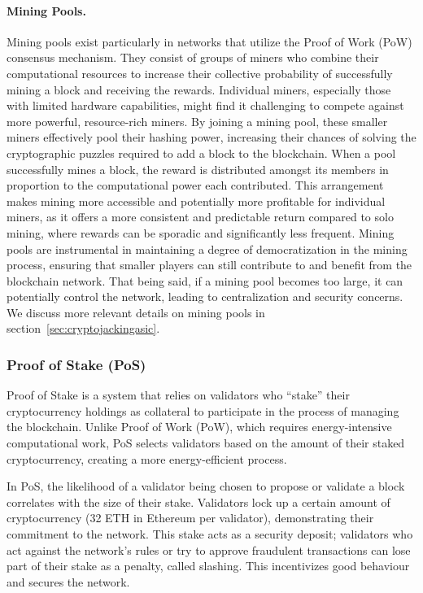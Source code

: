 \paragraph{Mining Pools.}
Mining pools exist particularly in networks that utilize the Proof of Work (PoW) consensus mechanism. They consist of groups of miners who combine their computational resources to increase their collective probability of successfully mining a block and receiving the rewards. Individual miners, especially those with limited hardware capabilities, might find it challenging to compete against more powerful, resource-rich miners. By joining a mining pool, these smaller miners effectively pool their hashing power, increasing their chances of solving the cryptographic puzzles required to add a block to the blockchain. When a pool successfully mines a block, the reward is distributed amongst its members in proportion to the computational power each contributed. This arrangement makes mining more accessible and potentially more profitable for individual miners, as it offers a more consistent and predictable return compared to solo mining, where rewards can be sporadic and significantly less frequent. Mining pools are instrumental in maintaining a degree of democratization in the mining process, ensuring that smaller players can still contribute to and benefit from the blockchain network. That being said, if a mining pool becomes too large, it can potentially control the network, leading to centralization and security concerns. We discuss more relevant details on mining pools in section~\ref{sec:cryptojackingasic}.



\subsubsection{Proof of Stake (PoS)}
Proof of Stake is a system that relies on validators who ``stake'' their cryptocurrency holdings as collateral to participate in the process of managing the blockchain. Unlike Proof of Work (PoW), which requires energy-intensive computational work, PoS selects validators based on the amount of their staked cryptocurrency, creating a more energy-efficient process.

In PoS, the likelihood of a validator being chosen to propose or validate a block correlates with the size of their stake. Validators lock up a certain amount of cryptocurrency (32 ETH in Ethereum per validator), demonstrating their commitment to the network. This stake acts as a security deposit; validators who act against the network's rules or try to approve fraudulent transactions can lose part of their stake as a penalty, called slashing. This incentivizes good behaviour and secures the network. 

